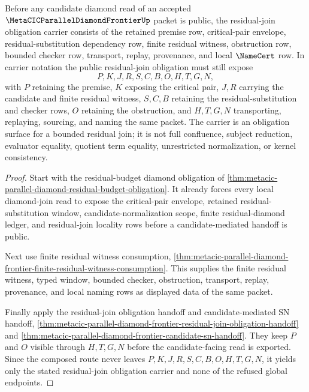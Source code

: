 \begin{theorem}
\label{thm:metacic-parallel-diamond-frontier-residual-join-obligation-carrier}
Before any candidate diamond read of an accepted $\MetaCICParallelDiamondFrontierUp$ packet is public, the residual-join obligation carrier consists of the retained premise row, critical-pair envelope, residual-substitution dependency row, finite residual witness, obstruction row, bounded checker row, transport, replay, provenance, and local $\NameCert$ row. In carrier notation the public residual-join obligation must still expose
$$
P,K,J,R,S,C,B,O,H,T,G,N,
$$
with $P$ retaining the premise, $K$ exposing the critical pair, $J,R$ carrying the candidate and finite residual witness, $S,C,B$ retaining the residual-substitution and checker rows, $O$ retaining the obstruction, and $H,T,G,N$ transporting, replaying, sourcing, and naming the same packet. The carrier is an obligation surface for a bounded residual join; it is not full confluence, subject reduction, evaluator equality, quotient term equality, unrestricted normalization, or kernel consistency.
\end{theorem}
\begin{proof}
Start with the residual-budget diamond obligation of \autoref{thm:metacic-parallel-diamond-residual-budget-obligation}. It already forces every local diamond-join read to expose the critical-pair envelope, retained residual-substitution window, candidate-normalization scope, finite residual-diamond ledger, and residual-join locality rows before a candidate-mediated handoff is public.

Next use finite residual witness consumption, \autoref{thm:metacic-parallel-diamond-frontier-finite-residual-witness-consumption}. This supplies the finite residual witness, typed window, bounded checker, obstruction, transport, replay, provenance, and local naming rows as displayed data of the same packet.

Finally apply the residual-join obligation handoff and candidate-mediated SN handoff, \autoref{thm:metacic-parallel-diamond-frontier-residual-join-obligation-handoff} and \autoref{thm:metacic-parallel-diamond-frontier-candidate-sn-handoff}. They keep $P$ and $O$ visible through $H,T,G,N$ before the candidate-facing read is exported. Since the composed route never leaves $P,K,J,R,S,C,B,O,H,T,G,N$, it yields only the stated residual-join obligation carrier and none of the refused global endpoints.
\end{proof}

